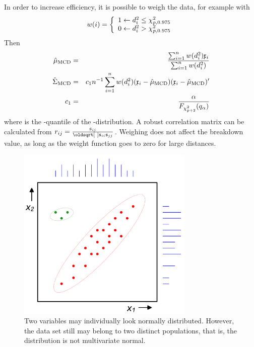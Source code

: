 \begin{refsection}
In order to increase efficiency, it is possible to weigh the data, for example with
\begin{equation}
  w(i) = \left\{
            \begin{array}{{r@{\;}c@{\;}l}}
               1 & \leftarrow & d^2_i \leq \chi^2_{p, 0.975}  \\
               0 & \leftarrow & d^2_i > \chi^2_{p, 0.975}
            \end{array}
         \right.
\end{equation}
Then
\begin{eqnarray}
  \nonumber
  \hat{\mu}_\mathrm{MCD} &=& \frac{\sum_{i=1}^n{w(d_i^2) \mathfrak{x}_i}}{\sum_{i=1}^n{w(d_i^2)}} \\
  \hat{\Sigma}_\mathrm{MCD} &=& c_1 n^{-1} \sum_{i=1}^n{w(d_i^2) (\mathfrak{x}_i - \hat{\mu}_\mathrm{MCD}) (\mathfrak{x}_i - \hat{\mu}_\mathrm{MCD})'} \\
  c_1 &=& \frac{\alpha}{F_{\chi^2_{p+2}}(q_\alpha)}
\end{eqnarray}
where  is the \skalar{\alpha}-quantile of the -distribution. A robust correlation matrix can be calculated from  \( \skalar{r}_{ij} = \frac{\AbsVec{s}_{ij}}{\sqrt{\AbsVec{s}_{ii} \AbsVec{s}_{jj}}} \). Weighing does not affect the breakdown value, as long as the weight function goes to zero for large distances.

\begin{figure}
 \caption{Two variables may individually look normally distributed. However, the data set still may belong to two distinct populations, that is, the distribution is not multivariate normal. }
 \label{fig:MultNorm}
 \centering
 \includegraphics[width=0.75\textwidth]{Graphics/MultivariateNormal}
\end{figure}


\end{refsection}
